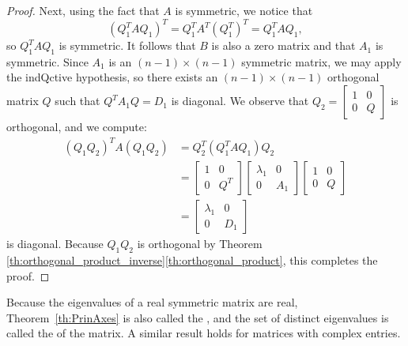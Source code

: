 \documentclass{ximera}
\begin{document}
\begin{proof}
Next, using the fact that $A$ is symmetric, we notice that
$$(Q_{1}^TAQ_{1})^T = Q_{1}^T A^T (Q_{1}^T)^T = Q_{1}^TAQ_{1},$$ so $Q_{1}^TAQ_{1}$ is symmetric.  It follows that $B$ is also a zero matrix and that $A_{1}$ is symmetric.  Since $A_{1}$ is an $(n - 1) \times (n - 1)$ symmetric matrix, we may apply the indQctive hypothesis, so there exists an $(n - 1) \times (n - 1)$ orthogonal matrix $Q$ such that $Q^{T}A_{1}Q = D_{1}$ is diagonal. We observe that $Q_{2} = \begin{bmatrix}
 1 & 0\\
 0 & Q
 \end{bmatrix}$
 is orthogonal, and we compute:
\begin{align*}
(Q_{1}Q_{2})^TA(Q_{1}Q_{2}) &= Q_{2}^T(Q_{1}^TAQ_{1})Q_{2} \\
&= \begin{bmatrix}
1 & 0 \\
0 & Q^T
\end{bmatrix} \begin{bmatrix}
\lambda_{1} & 0 \\
0 & A_{1}
\end{bmatrix}\begin{bmatrix}
1 & 0 \\
0 & Q
\end{bmatrix}\\
&= \begin{bmatrix}
\lambda_{1} & 0 \\
0 & D_{1}
\end{bmatrix}
\end{align*}
is diagonal. Because $Q_{1}Q_{2}$ is orthogonal by Theorem \ref{th:orthogonal_product_inverse}\ref{th:orthogonal_product}, this completes the proof.
\end{proof}








Because the eigenvalues of a real symmetric matrix are real, Theorem~\ref{th:PrinAxes} is also called the , and the set of distinct eigenvalues is called the  of the matrix. A similar result holds for matrices with complex entries.
\end{document}
